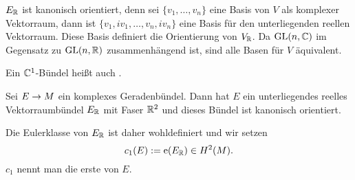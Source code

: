 $E_{\mathbb{R}}$ ist kanonisch orientiert, denn sei $\{v_1, \ldots, v_n\}$ eine Basis von $V$ als komplexer Vektorraum, dann ist $\{v_1, iv_1, \ldots, v_n, iv_n\}$ eine Basis für den unterliegenden reellen Vektorraum. Diese Basis definiert die Orientierung von $V_{\mathbb{R}}$. Da $\mathrm{GL}(n,\mathbb{C})$ im Gegensatz zu $\mathrm{GL}(n,\mathbb{R})$ zusammenhängend ist, sind alle Basen für $V$ äquivalent.

Ein $\mathbb{C}^1$-Bündel heißt auch .

Sei $E \overset{}{\rightarrow} M$ ein komplexes Geradenbündel. Dann hat $E$ ein unterliegendes reelles Vektorraumbündel $E_{\mathbb{R}}$ mit Faser $\mathbb{R}^2$ und dieses Bündel ist kanonisch orientiert.

Die Eulerklasse von $E_{\mathbb{R}}$ ist daher wohldefiniert und wir setzen
\[ c_1(E) := \mathrm{e} (E_{\mathbb{R}}) \in H^2(M). \]
$c_1$ nennt man die erste  von $E$.